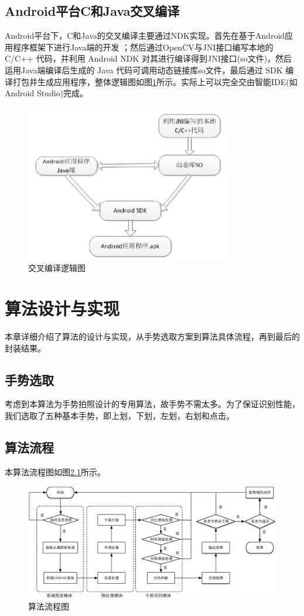 \documentclass{XDBAthesis}
\begin{document}
\section{Android平台C和Java交叉编译}
Android平台下，C和Java的交叉编译主要通过NDK实现。首先在基于Android应用程序框架下进行Java端的开发\cite{祝志远2015基于} ；然后通过OpenCV与JNI接口编写本地的 C/C++ 代码，并利用 Android NDK 对其进行编译得到JNI接口(so文件)，然后运用Java端编译后生成的 Java 代码可调用动态链接库so文件，最后通过 SDK 编译打包并生成应用程序，整体逻辑图如图\ref{fg:whole}所示。实际上可以完全交由智能IDE(如Android Studio)完成。
\begin{figure}[htb]
    \centering
    \includegraphics[width=0.8\textwidth]{figure/opencv}
    \caption{交叉编译逻辑图}
    \label{fg:whole}
\end{figure}



\chapter{算法设计与实现}
本章详细介绍了算法的设计与实现，从手势选取方案到算法具体流程，再到最后的封装结果。
\section{手势选取}
考虑到本算法为手势拍照设计的专用算法，故手势不需太多。为了保证识别性能，我们选取了五种基本手势，即上划，下划，左划，右划和点击。
\section{算法流程}
本算法流程图如图\ref{fg:af}所示。
\begin{figure}[htb]
    \centering
    \includegraphics[width=\textwidth ]{figure/algorithmflow}
    \caption{算法流程图}
    \label{fg:af}
\end{figure}
\end{document}
